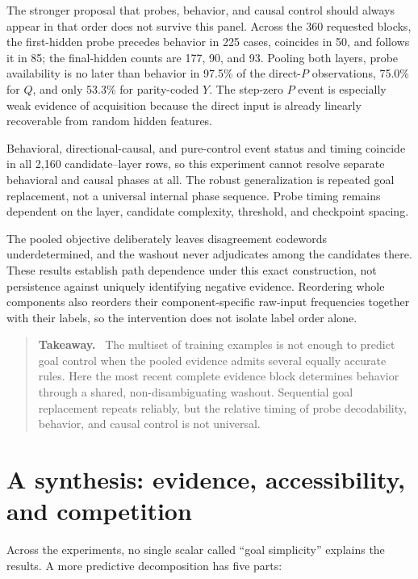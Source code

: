 \documentclass[11pt,a4paper]{article}
\newenvironment{takeaway}{%
  \begin{quote}\small\color{ink}\noindent\textbf{Takeaway.}\ 
}{%
  \end{quote}
}
\begin{document}
The stronger proposal that probes, behavior, and causal control should always appear in that order does not survive this panel. Across the 360 requested blocks, the first-hidden probe precedes behavior in 225 cases, coincides in 50, and follows it in 85; the final-hidden counts are 177, 90, and 93. Pooling both layers, probe availability is no later than behavior in 97.5\% of the direct-$P$ observations, 75.0\% for $Q$, and only 53.3\% for parity-coded $Y$. The step-zero $P$ event is especially weak evidence of acquisition because the direct input is already linearly recoverable from random hidden features.

Behavioral, directional-causal, and pure-control event status and timing coincide in all 2,160 candidate--layer rows, so this experiment cannot resolve separate behavioral and causal phases at all. The robust generalization is repeated goal replacement, not a universal internal phase sequence. Probe timing remains dependent on the layer, candidate complexity, threshold, and checkpoint spacing.

The pooled objective deliberately leaves disagreement codewords underdetermined, and the washout never adjudicates among the candidates there. These results establish path dependence under this exact construction, not persistence against uniquely identifying negative evidence. Reordering whole components also reorders their component-specific raw-input frequencies together with their labels, so the intervention does not isolate label order alone.

\begin{takeaway}
The multiset of training examples is not enough to predict goal control when the pooled evidence admits several equally accurate rules. Here the most recent complete evidence block determines behavior through a shared, non-disambiguating washout. Sequential goal replacement repeats reliably, but the relative timing of probe decodability, behavior, and causal control is not universal.
\end{takeaway}

\section*{A synthesis: evidence, accessibility, and competition}

Across the experiments, no single scalar called ``goal simplicity'' explains the results. A more predictive decomposition has five parts:
\end{document}
